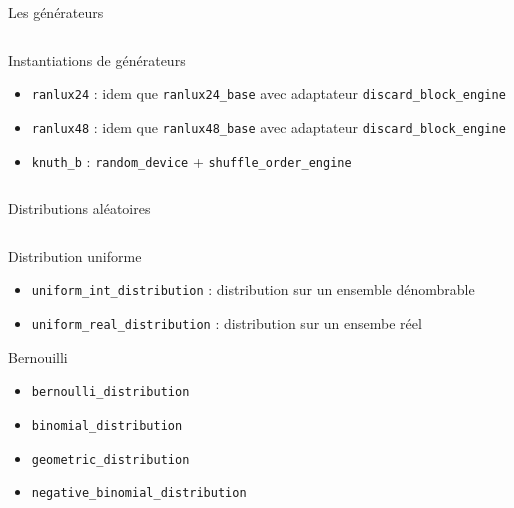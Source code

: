 \documentclass[handout,10pt]{beamer}
\begin{document}
\begin{frame}[fragile]{Les générateurs}
\begin{columns}
\begin{column}{0.5\textwidth}
\begin{block}{Instantiations de générateurs}
\begin{itemize}
  \item \lstinline$ranlux24$ : idem que \lstinline$ranlux24_base$ avec adaptateur \lstinline$discard_block_engine$
  \item \lstinline$ranlux48$ : idem que \lstinline$ranlux48_base$ avec adaptateur \lstinline$discard_block_engine$
  \item \lstinline$knuth_b$ : \lstinline$random_device$ + \lstinline$shuffle_order_engine$
 \end{itemize}
 \end{block}
 \end{column}
\end{columns}
\end{frame}

\begin{frame}[fragile]{Distributions aléatoires}
\tiny
\begin{columns}
 \begin{column}{0.5\textwidth}
 \begin{block}{Distribution uniforme}
 \begin{itemize}
  \item \lstinline$uniform_int_distribution$ : distribution sur un ensemble dénombrable
  \item \lstinline$uniform_real_distribution$ : distribution sur un ensembe réel
 \end{itemize}
 \end{block}

 \begin{block}{Bernouilli}
 \begin{itemize}
  \item \lstinline$bernoulli_distribution$
  \item \lstinline$binomial_distribution$
  \item \lstinline$geometric_distribution$
  \item \lstinline$negative_binomial_distribution$
 \end{itemize}
 \end{block}
 

\end{column}
\end{columns}
\end{frame}
\end{document}

